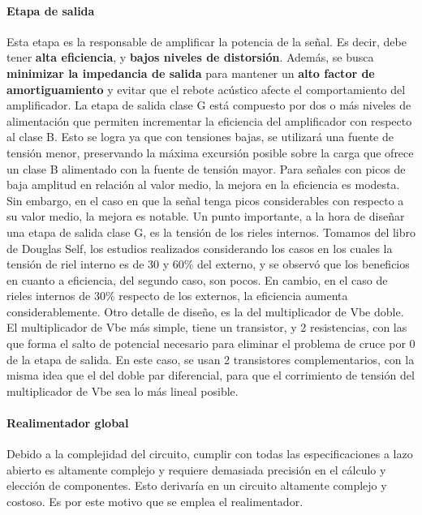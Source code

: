 \documentclass[a4paper,12pt,twoside]{article}
\begin{document}
\paragraph{Etapa de salida}
Esta etapa es la responsable de amplificar la potencia de la señal. Es decir, debe tener \textbf{alta eficiencia}, y \textbf{bajos niveles de distorsión}. Además, se busca \textbf{minimizar la impedancia de salida} para mantener un \textbf{alto factor de amortiguamiento} y evitar que el rebote acústico afecte el comportamiento del amplificador. 
La etapa de salida clase G está compuesto por dos o más niveles de alimentación que permiten incrementar la eficiencia del amplificador con respecto al clase B. Esto se logra ya que con tensiones bajas, se utilizará una fuente de tensión menor, preservando la máxima excursión posible sobre la carga que ofrece un clase B alimentado con la fuente de tensión mayor. Para señales con picos de baja amplitud en relación al valor medio, la mejora en la eficiencia es modesta. Sin embargo, en el caso en que la señal tenga picos considerables con respecto a su valor medio, la mejora es notable. Un punto importante, a la hora de diseñar una etapa de salida clase G, es la tensión de los rieles internos. Tomamos del libro de Douglas Self, los estudios realizados considerando los casos en los cuales la tensión de riel interno es de 30 y 60\% del externo, y se observó que los beneficios en cuanto a eficiencia, del segundo caso, son pocos. En cambio, en el caso de rieles internos de 30\% respecto de los externos, la eficiencia aumenta considerablemente. Otro detalle de diseño, es la del multiplicador de Vbe doble. El multiplicador de Vbe más simple, tiene un transistor, y 2 resistencias, con las que forma el salto de potencial necesario para eliminar el problema de cruce por 0 de la etapa de salida. En este caso, se usan 2 transistores complementarios, con la misma idea que el del doble par diferencial, para que el corrimiento de tensión del multiplicador de Vbe sea lo más lineal posible.

\paragraph{Realimentador global}


Debido a la complejidad del circuito, cumplir con todas las especificaciones a lazo abierto es altamente complejo y requiere demasiada precisión en el cálculo y elección de componentes. Esto derivaría en un circuito altamente complejo y costoso. Es por este motivo que se emplea el realimentador.
\end{document}
